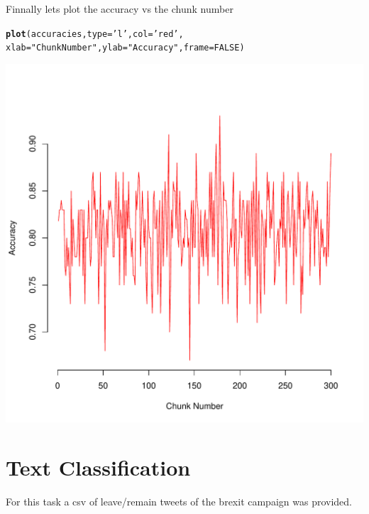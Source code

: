 \documentclass[10pt  ,usenames, dvipsnames]{article}\usepackage[]{graphicx}\usepackage[]{color}
\makeatletter
\def\maxwidth{ %
  \ifdim\Gin@nat@width>\linewidth
    \linewidth
  \else
    \Gin@nat@width
  \fi
}
\newcommand{\hlnum}[1]{\textcolor[rgb]{0.686,0.059,0.569}{#1}}%
\newcommand{\hlstr}[1]{\textcolor[rgb]{0.192,0.494,0.8}{#1}}%
\newcommand{\hlstd}[1]{\textcolor[rgb]{0.345,0.345,0.345}{#1}}%
\newcommand{\hlkwc}[1]{\textcolor[rgb]{0.333,0.667,0.333}{#1}}%
\newcommand{\hlkwd}[1]{\textcolor[rgb]{0.737,0.353,0.396}{\textbf{#1}}}%
\newenvironment{kframe}{%
 \def\at@end@of@kframe{}%
 \ifinner\ifhmode%
  \def\at@end@of@kframe{\end{minipage}}%
  \begin{minipage}{\columnwidth}%
 \fi\fi%
 \def\FrameCommand##1{\hskip\@totalleftmargin \hskip-\fboxsep
 \colorbox{shadecolor}{##1}\hskip-\fboxsep
     \hskip-\linewidth \hskip-\@totalleftmargin \hskip\columnwidth}%
 \MakeFramed {\advance\hsize-\width
   \@totalleftmargin\z@ \linewidth\hsize
   \@setminipage}}%
 {\par\unskip\endMakeFramed%
 \at@end@of@kframe}
\newenvironment{knitrout}{}{} %
\makeatother
\begin{document}
Finnally lets plot the accuracy vs the chunk number

\begin{knitrout}
\color{fgcolor}\begin{kframe}
\begin{alltt}
\hlkwd{plot}\hlstd{(accuracies,}\hlkwc{type}\hlstd{=}\hlstr{'l'}\hlstd{,}\hlkwc{col}\hlstd{=}\hlstr{'red'}\hlstd{,}
     \hlkwc{xlab}\hlstd{=}\hlstr{"Chunk Number"}\hlstd{,}\hlkwc{ylab}\hlstd{=}\hlstr{"Accuracy"}\hlstd{,}\hlkwc{frame}\hlstd{=}\hlnum{FALSE}\hlstd{)}
\end{alltt}
\end{kframe}
\end{knitrout}


\begin{knitrout}
\color{fgcolor}
\includegraphics[width=\maxwidth]{figure/unnamed-chunk-65-1} 

\end{knitrout}

\clearpage

\section {Text Classification}
For this task a csv of leave/remain tweets of the brexit campaign was provided.
\end{document}
